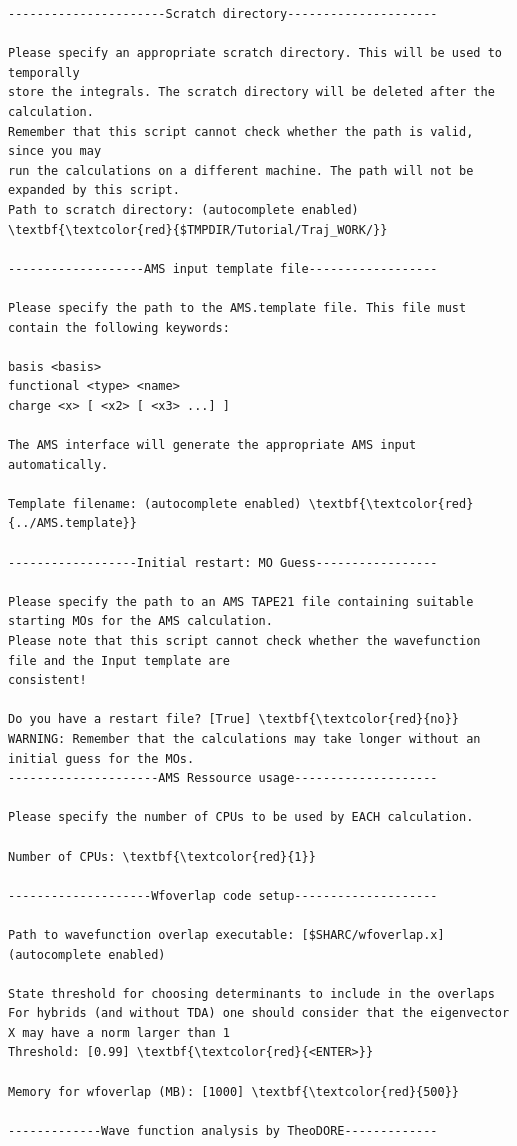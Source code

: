 \documentclass[a4paper,11pt,DIV=15,openany]{scrbook}
\begin{document}
\begin{oframed}
\begin{Verbatim}[commandchars=\\\{\}]
----------------------Scratch directory---------------------

Please specify an appropriate scratch directory. This will be used to temporally 
store the integrals. The scratch directory will be deleted after the calculation. 
Remember that this script cannot check whether the path is valid, since you may 
run the calculations on a different machine. The path will not be expanded by this script.
Path to scratch directory: (autocomplete enabled) \textbf{\textcolor{red}{$TMPDIR/Tutorial/Traj_WORK/}}

-------------------AMS input template file------------------

Please specify the path to the AMS.template file. This file must contain the following keywords:

basis <basis>
functional <type> <name>
charge <x> [ <x2> [ <x3> ...] ]

The AMS interface will generate the appropriate AMS input automatically.

Template filename: (autocomplete enabled) \textbf{\textcolor{red}{../AMS.template}}

------------------Initial restart: MO Guess-----------------

Please specify the path to an AMS TAPE21 file containing suitable starting MOs for the AMS calculation. 
Please note that this script cannot check whether the wavefunction file and the Input template are 
consistent!

Do you have a restart file? [True] \textbf{\textcolor{red}{no}}
WARNING: Remember that the calculations may take longer without an initial guess for the MOs.
---------------------AMS Ressource usage--------------------

Please specify the number of CPUs to be used by EACH calculation.

Number of CPUs: \textbf{\textcolor{red}{1}} 

--------------------Wfoverlap code setup--------------------

Path to wavefunction overlap executable: [$SHARC/wfoverlap.x] (autocomplete enabled) 

State threshold for choosing determinants to include in the overlaps
For hybrids (and without TDA) one should consider that the eigenvector X may have a norm larger than 1
Threshold: [0.99] \textbf{\textcolor{red}{<ENTER>}}

Memory for wfoverlap (MB): [1000] \textbf{\textcolor{red}{500}}

-------------Wave function analysis by TheoDORE-------------


\end{Verbatim}
\end{oframed}
\end{document}
